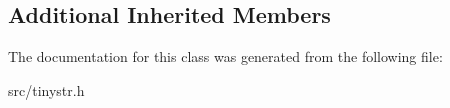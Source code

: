 \subsection*{Additional Inherited Members}


The documentation for this class was generated from the following file\+:\begin{DoxyCompactItemize}
\item 
src/tinystr.\+h\end{DoxyCompactItemize}
